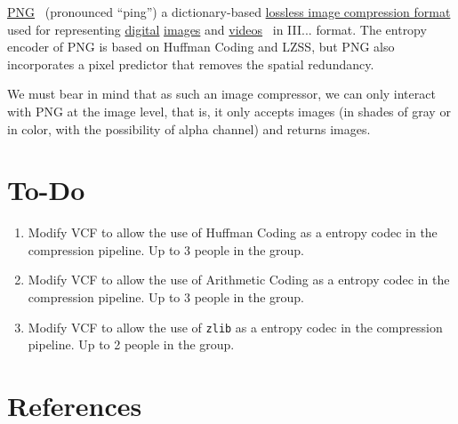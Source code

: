\href{https://en.wikipedia.org/wiki/Portable_Network_Graphics}{PNG}~\cite{vruiz__PNG}
(pronounced ``ping'') a dictionary-based
\href{https://en.wikipedia.org/wiki/Lossless_compression}{lossless
  image compression format} used for representing
\href{https://en.wikipedia.org/wiki/Digital_data}{digital}
\href{https://en.wikipedia.org/wiki/Digital_image}{images} and
\href{https://en.wikipedia.org/wiki/Video}{videos}~\cite{vruiz__image_video}
in III... format. The entropy encoder of PNG is based on Huffman
Coding and LZSS, but PNG also incorporates a pixel predictor that
removes the spatial redundancy.

We must bear in mind that as such an image compressor, we can only
interact with PNG at the image level, that is, it only accepts images
(in shades of gray or in color, with the possibility of alpha channel)
and returns images.



\section{To-Do}
\begin{enumerate}
\item Modify VCF to allow the use of Huffman Coding as a entropy codec
  in the compression pipeline. Up to 3 people in the group.
\item Modify VCF to allow the use of Arithmetic Coding as a entropy
  codec in the compression pipeline. Up to 3 people in the group.
\item Modify VCF to allow the use of \texttt{zlib} as a entropy codec
  in the compression pipeline. Up to 2 people in the group.
\end{enumerate}

\section{References}

\renewcommand{\addcontentsline}[3]{}%

